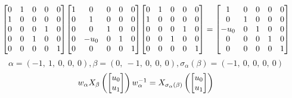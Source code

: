 \documentclass[11pt]{article}
\theoremstyle{definition}
\begin{document}
\[
\scaletoalign{\textwidth}{{\left[\begin{matrix}0 & 1 & 0 & 0 & 0\\1 & 0 & 0 & 0 & 0\\0 & 0 & 0 & 1 & 0\\0 & 0 & 1 & 0 & 0\\0 & 0 & 0 & 0 & 1\end{matrix}\right]} {\left[\begin{matrix}1 & 0 & 0 & 0 & 0\\0 & 1 & 0 & 0 & 0\\0 & 0 & 1 & 0 & 0\\0 & - u_{0} & 0 & 1 & 0\\0 & 0 & 0 & 0 & 1\end{matrix}\right]} {\left[\begin{matrix}0 & 1 & 0 & 0 & 0\\1 & 0 & 0 & 0 & 0\\0 & 0 & 0 & 1 & 0\\0 & 0 & 1 & 0 & 0\\0 & 0 & 0 & 0 & 1\end{matrix}\right]} = {\left[\begin{matrix}1 & 0 & 0 & 0 & 0\\0 & 1 & 0 & 0 & 0\\- u_{0} & 0 & 1 & 0 & 0\\0 & 0 & 0 & 1 & 0\\0 & 0 & 0 & 0 & 1\end{matrix}\right]}}
\]
\[
\alpha = \left( -1, \  1, \  0, \  0, \  0\right), \beta = \left( 0, \  -1, \  0, \  0, \  0\right), \sigma_{\alpha}(\beta) = \left( -1, \  0, \  0, \  0, \  0\right)
\]
\[
\scaletoalign{\textwidth}{w_{\alpha} X_{\beta}\left(\left[\begin{matrix}u_{0}\\u_{1}\end{matrix}\right]\right) w_{\alpha}^{-1} = X_{\sigma_{\alpha}\left(\beta\right)}\left(\left[\begin{matrix}u_{0}\\u_{1}\end{matrix}\right]\right)}
\]
\end{document}
